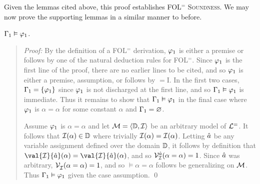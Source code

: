 %
%
%   
%
%
%

Given the lemmas cited above, this proof establishes \textsc{FOL$^=$ Soundness}.
We may now prove the supporting lemmas in a similar manner to before.

\begin{Lthm} \label{lemma:FOL-soundness-base}
  $\Gamma_1 \vDash \varphi_1$.
\end{Lthm}
\vspace{-.2in}

\begin{quote} 
  \textit{Proof:} 
  By the definition of a FOL$^=$ derivation, $\varphi_1$ is either a premise or follows by one of the natural deduction rules for FOL$^=$. 
  Since $\varphi_1$ is the first line of the proof, there are no earlier lines to be cited, and so $\varphi_1$ is either a premise, assumption, or follows by $=$I.
  In the first two cases, $\Gamma_1=\lbrace\varphi_1\rbrace$ since $\varphi_1$ is not discharged at the first line, and so $\Gamma_1 \vDash \varphi_1$ is immediate.
  Thus it remains to show that $\Gamma_1 \vDash \varphi_1$ in the final case where $\varphi_1$ is $\alpha = \alpha$ for some constant $\alpha$ and $\Gamma_1 = \varnothing$. 

  Assume $\varphi_1$ is $\alpha = \alpha$ and let $\mathcal{M} = \langle\mathbb{D}, \mathcal{I}\rangle$ be an arbitrary model of $\mathcal{L}^{=}$. 
  It follows that $\mathcal{I}(\alpha) \in \mathbb{D}$ where trivially $\mathcal{I}(\alpha) = \mathcal{I}(\alpha)$.
  Letting $\hat{a}$ be any variable assignment defined over the domain $\mathbb{D}$, it follows by definition that $\val{\I}{\va{a}}(\alpha) = \val{\I}{\va{a}}(\alpha)$, and so $\mathcal{V}_{\mathcal{I}}^{\hat{a}}(\alpha = \alpha) = 1$.
  Since $\hat{a}$ was arbitrary, $\mathcal{V}_{\mathcal{I}}^{}(\alpha = \alpha) = 1$, and so $\vDash \alpha = \alpha$ follows be generalizing on $\mathcal{M}$. 
  Thus $\Gamma_1 \vDash \varphi_1$ given the case assumption.
  \qed
\end{quote}

